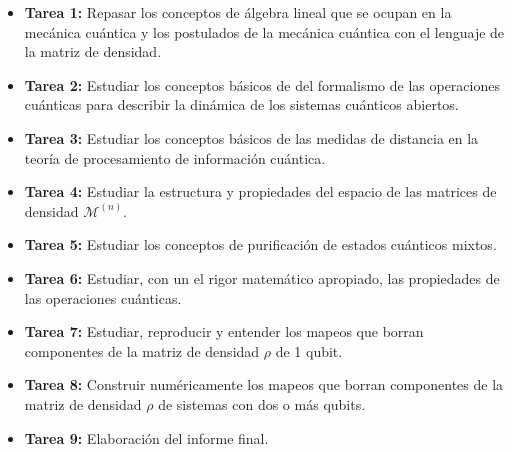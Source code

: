 \documentclass[11pt, spanish, letterpage]{article}
\begin{document}
\begin{itemize}
	\item \textbf{Tarea 1:} Repasar los conceptos de álgebra lineal que se ocupan en la mecánica cuántica y los postulados de la mecánica cuántica con el lenguaje de la matriz de densidad.
	\item \textbf{Tarea 2:} Estudiar los conceptos básicos de del formalismo de las operaciones cuánticas para describir la dinámica de los sistemas cuánticos abiertos.
	\item \textbf{Tarea 3:} Estudiar los conceptos básicos de las medidas de distancia en la teoría de procesamiento de información cuántica. 
	\item \textbf{Tarea 4:} Estudiar la estructura y propiedades del espacio de las matrices de densidad $\mathcal{M}^{(n)}$.
	\item \textbf{Tarea 5:} Estudiar los conceptos de purificación de estados cuánticos mixtos.
	\item \textbf{Tarea 6:} Estudiar, con un el rigor matemático apropiado, las propiedades de las operaciones cuánticas. 
	\item \textbf{Tarea 7:} Estudiar, reproducir y entender los mapeos que borran componentes de la matriz de densidad $\rho$ de 1 qubit.
	\item \textbf{Tarea 8:} Construir numéricamente los mapeos que borran componentes de la matriz de densidad $\rho$ de sistemas con dos o más qubits.
	\item \textbf{Tarea 9:} Elaboración del informe final. 
\end{itemize}



\end{document}
